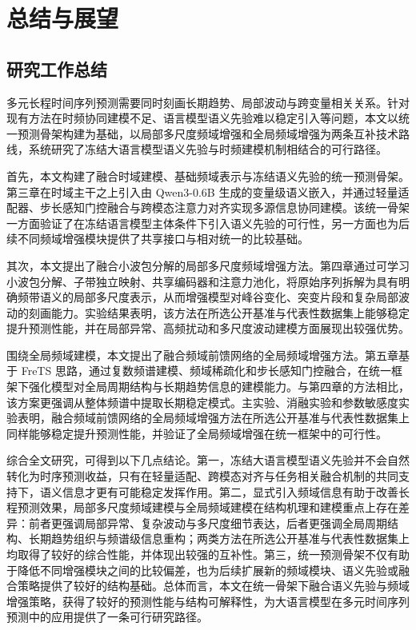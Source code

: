 ﻿\chapter{总结与展望}

\section{研究工作总结}
多元长程时间序列预测需要同时刻画长期趋势、局部波动与跨变量相关关系。针对现有方法在时频协同建模不足、语言模型语义先验难以稳定引入等问题，本文以统一预测骨架构建为基础，以局部多尺度频域增强和全局频域增强为两条互补技术路线，系统研究了冻结大语言模型语义先验与时频建模机制相结合的可行路径。

首先，本文构建了融合时域建模、基础频域表示与冻结语义先验的统一预测骨架。第三章在时域主干之上引入由 Qwen3-0.6B 生成的变量级语义嵌入，并通过轻量适配器、步长感知门控融合与跨模态注意力对齐实现多源信息协同建模。该统一骨架一方面验证了在冻结语言模型主体条件下引入语义先验的可行性，另一方面也为后续不同频域增强模块提供了共享接口与相对统一的比较基础。

其次，本文提出了融合小波包分解的局部多尺度频域增强方法。第四章通过可学习小波包分解、子带独立映射、共享编码器和注意力池化，将原始序列拆解为具有明确频带语义的局部多尺度表示，从而增强模型对峰谷变化、突变片段和复杂局部波动的刻画能力。实验结果表明，该方法在所选公开基准与代表性数据集上能够稳定提升预测性能，并在局部异常、高频扰动和多尺度波动建模方面展现出较强优势。

围绕全局频域建模，本文提出了融合频域前馈网络的全局频域增强方法。第五章基于 FreTS 思路，通过复数频谱建模、频域稀疏化和步长感知门控融合，在统一框架下强化模型对全局周期结构与长期趋势信息的建模能力。与第四章的方法相比，该方案更强调从整体频谱中提取长期稳定模式。主实验、消融实验和参数敏感度实验表明，融合频域前馈网络的全局频域增强方法在所选公开基准与代表性数据集上同样能够稳定提升预测性能，并验证了全局频域增强在统一框架中的可行性。

综合全文研究，可得到以下几点结论。第一，冻结大语言模型语义先验并不会自然转化为时序预测收益，只有在轻量适配、跨模态对齐与任务相关融合机制的共同支持下，语义信息才更有可能稳定发挥作用。第二，显式引入频域信息有助于改善长程预测效果，局部多尺度频域建模与全局频域建模在结构机理和建模重点上存在差异：前者更强调局部异常、复杂波动与多尺度细节表达，后者更强调全局周期结构、长期趋势组织与频谱级信息重构；两类方法在所选公开基准与代表性数据集上均取得了较好的综合性能，并体现出较强的互补性。第三，统一预测骨架不仅有助于降低不同增强模块之间的比较偏差，也为后续扩展新的频域模块、语义先验或融合策略提供了较好的结构基础。总体而言，本文在统一骨架下融合语义先验与频域增强策略，获得了较好的预测性能与结构可解释性，为大语言模型在多元时间序列预测中的应用提供了一条可行研究路径。


